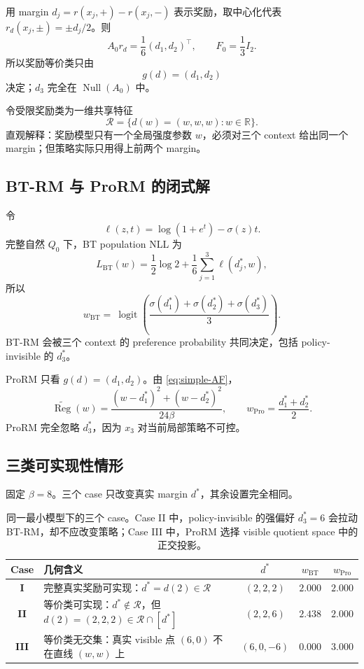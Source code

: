 \documentclass[UTF8,11pt,a4paper,fontset=none]{ctexart}
\newcommand{\R}{\mathbb{R}}
\newcommand{\Reg}{\operatorname{Reg}}
\newcommand{\Null}{\operatorname{Null}}
\newcommand{\sig}{\sigma}
\begin{document}
用 margin $d_j=r(x_j,+)-r(x_j,-)$ 表示奖励，取中心化代表 $r_d(x_j,\pm)=\pm d_j/2$。则
\begin{equation}
A_0r_d=\frac16(d_1,d_2)^\top,
\qquad
F_0=\frac13I_2.
\label{eq:simple-AF}
\end{equation}
所以奖励等价类只由
\[
\boxed{g(d)=(d_1,d_2)}
\]
决定；$d_3$ 完全在 $\Null(A_0)$ 中。

令受限奖励类为一维共享特征
\[
\boxed{\mathcal R=\{d(w)=(w,w,w):w\in\R\}.}
\]
直观解释：奖励模型只有一个全局强度参数 $w$，必须对三个 context 给出同一个 margin；但策略实际只用得上前两个 margin。

\subsection{BT-RM 与 ProRM 的闭式解}

令
\[
\ell(z,t)=\log(1+e^t)-\sig(z)t.
\]
完整自然 $Q_0$ 下，BT population NLL 为
\begin{equation}
L_{\mathrm{BT}}(w)=\frac12\log2+\frac16\sum_{j=1}^{3}\ell(d_j^*,w),
\label{eq:example-nll}
\end{equation}
所以
\begin{equation}
\boxed{
w_{\mathrm{BT}}=\
\operatorname{logit}\left(\frac{\sig(d_1^*)+\sig(d_2^*)+\sig(d_3^*)}{3}\right).
}
\label{eq:example-wbt}
\end{equation}
BT-RM 会被三个 context 的 preference probability 共同决定，包括 policy-invisible 的 $d_3^*$。

ProRM 只看 $g(d)=(d_1,d_2)$。由 \cref{eq:simple-AF}，
\begin{equation}
\boxed{
\widetilde{\Reg}(w)=\frac{(w-d_1^*)^2+(w-d_2^*)^2}{24\beta},
\qquad
w_{\mathrm{Pro}}=\frac{d_1^*+d_2^*}{2}.
}
\label{eq:example-wpro}
\end{equation}
ProRM 完全忽略 $d_3^*$，因为 $x_3$ 对当前局部策略不可控。

\subsection{三类可实现性情形}

固定 $\beta=8$。三个 case 只改变真实 margin $d^*$，其余设置完全相同。

\begin{table}[ht]
\centering
\small
\setlength{\tabcolsep}{4pt}
\begin{tabularx}{\textwidth}{>{\bfseries}c X c c c}
\toprule
\rowcolor{lightblue}
Case & 几何含义 & $d^*$ & $w_{\mathrm{BT}}$ & $w_{\mathrm{Pro}}$\\
\midrule
I & 完整真实奖励可实现：$d^*=d(2)\in\mathcal R$ & $(2,2,2)$ & $2.000$ & $2.000$\\
II & 等价类可实现：$d^*\notin\mathcal R$，但 $d(2)=(2,2,2)\in\mathcal R\cap[d^*]$ & $(2,2,6)$ & $2.438$ & $2.000$\\
III & 等价类无交集：真实 visible 点 $(6,0)$ 不在直线 $(w,w)$ 上 & $(6,0,-6)$ & $0.000$ & $3.000$\\
\bottomrule
\end{tabularx}
\caption{同一最小模型下的三个 case。Case II 中，policy-invisible 的强偏好 $d_3^*=6$ 会拉动 BT-RM，却不应改变策略；Case III 中，ProRM 选择 visible quotient space 中的正交投影。}
\label{tab:cases}
\end{table}
\end{document}
